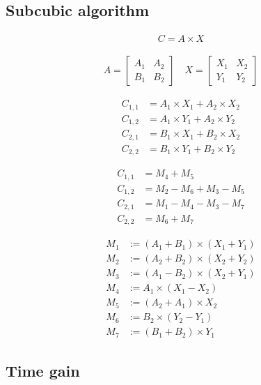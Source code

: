 \documentclass[a4paper,11pt]{article}
\begin{document}
\subsection{Subcubic algorithm}

\begin{align*}
C = A \times X
\end{align*}

\begin{align*}
A = 
\begin{bmatrix}
A_{1} & A_{2} \\
B_{1} & B_{2}
\end{bmatrix}
\quad
X = 
\begin{bmatrix}
X_{1} & X_{2} \\
Y_{1} & Y_{2}
\end{bmatrix}
\end{align*}

\begin{align*}
C_{1,1} &= A_{1} \times X_{1} + A_{2}  \times X_{2} \\
C_{1,2} &= A_{1} \times Y_{1} + A_{2}  \times Y_{2} \\
C_{2,1} &= B_{1} \times X_{1} + B_{2}  \times X_{2} \\
C_{2,2} &= B_{1} \times Y_{1} + B_{2}  \times Y_{2}
\end{align*}

\begin{align*}
C_{1,1} &= M_{4} + M_{5}\\
C_{1,2} &= M_{2} - M_{6} + M_{3} - M_{5} \\
C_{2,1} &= M_{1} - M_{4} - M_{3} - M_{7} \\
C_{2,2} &= M_{6} + M_{7}
\end{align*}

\begin{align*}
M_{1} &:= (A_{1} + B_{1}) \times (X_{1} + Y_{1}) \\
M_{2} &:= (A_{2} + B_{2}) \times (X_{2} + Y_{2}) \\
M_{3} &:= (A_{1} - B_{2}) \times (X_{2} + Y_{1}) \\
M_{4} &:= A_{1} \times (X_{1} - X_{2}) \\
M_{5} &:= (A_{2} + A_{1}) \times X_{2} \\
M_{6} &:= B_{2} \times (Y_{2} - Y_{1}) \\
M_{7} &:= (B_{1} + B_{2}) \times Y_{1}
\end{align*}



\subsection{Time gain}
\end{document}

